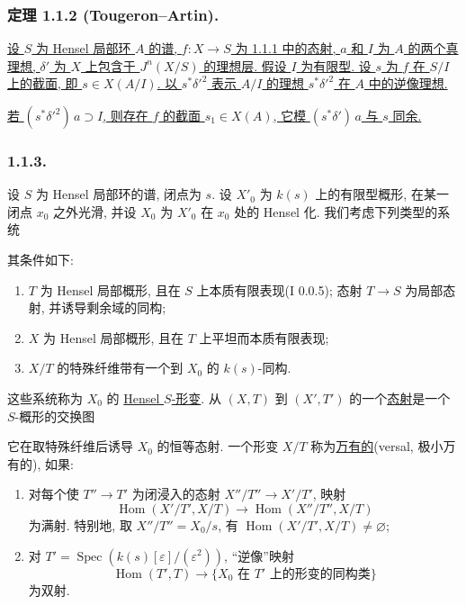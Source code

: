 \subsubsection*{定理 1.1.2 (Tougeron--Artin).}
\underline{设 $S$ 为 Hensel 局部环 $A$ 的谱, $f:X\to S$ 为 1.1.1 中的态射, $a$ 和 $I$ 为 $A$ 的两个真理想, $\delta'$ 为 $X$ 上包含于 $J^n(X/S)$ 的理想层. 假设 $I$ 为有限型. 设 $s$ 为 $f$ 在 $S/I$ 上的截面, 即 $s\in X(A/I)$. 以 $s^*\delta'^2$ 表示 $A/I$ 的理想 $s^*\delta'^2$ 在 $A$ 中的逆像理想.}

\underline{若 $(s^*\delta'^2)\,a\supset I$, 则存在 $f$ 的截面 $s_1\in X(A)$, 它模 $(s^*\delta')\,a$ 与 $s$ 同余.}

\subsubsection*{1.1.3.}
设 $S$ 为 Hensel 局部环的谱, 闭点为 $s$. 设 $X'_0$ 为 $k(s)$ 上的有限型概形, 在某一闭点 $x_0$ 之外光滑, 并设 $X_0$ 为 $X'_0$ 在 $x_0$ 处的 Hensel 化. 我们考虑下列类型的系统
\begin{center}
\end{center}
其条件如下:
\begin{enumerate}[label=(\alph*),leftmargin=2.6em]
\item $T$ 为 Hensel 局部概形, 且在 $S$ 上本质有限表现(I 0.0.5); 态射 $T\to S$ 为局部态射, 并诱导剩余域的同构;

\item $X$ 为 Hensel 局部概形, 且在 $T$ 上平坦而本质有限表现;

\item $X/T$ 的特殊纤维带有一个到 $X_0$ 的 $k(s)$-同构.
\end{enumerate}
这些系统称为 $X_0$ 的 \underline{Hensel $S$-形变}. 从 $(X,T)$ 到 $(X',T')$ 的一个\underline{态射}是一个 $S$-概形的交换图
\begin{center}
\end{center}
它在取特殊纤维后诱导 $X_0$ 的恒等态射. 一个形变 $X/T$ 称为\underline{万有的}(versal, 极小万有的), 如果:
\begin{enumerate}[label=(\alph*),leftmargin=2.6em]
\item 对每个使 $T''\to T'$ 为闭浸入的态射 $X''/T''\longrightarrow X'/T'$, 映射
\[
\operatorname{Hom}(X'/T',X/T)
\longrightarrow\operatorname{Hom}(X''/T'',X/T)
\]
为满射. 特别地, 取 $X''/T''=X_0/s$, 有 $\operatorname{Hom}(X'/T',X/T)\ne\varnothing$;

\item 对 $T'=\operatorname{Spec}(k(s)[\varepsilon]/(\varepsilon^2))$, “逆像”映射
\[
\operatorname{Hom}(T',T)\longrightarrow
\{\text{$X_0$ 在 $T'$ 上的形变的同构类}\}
\]
为双射.
\end{enumerate}

